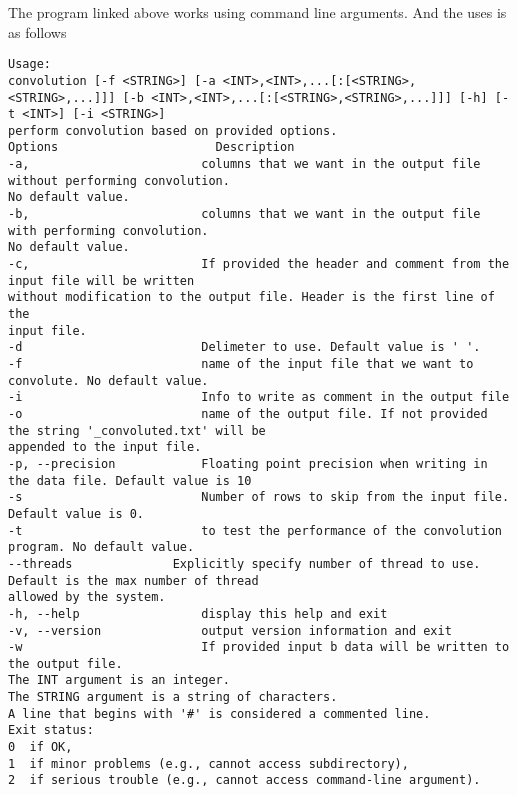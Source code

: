 The program linked above works using command line arguments. And the uses is as follows\\

\begin{lstlisting}[style=Instruction]
Usage:
convolution [-f <STRING>] [-a <INT>,<INT>,...[:[<STRING>,<STRING>,...]]] [-b <INT>,<INT>,...[:[<STRING>,<STRING>,...]]] [-h] [-t <INT>] [-i <STRING>]
perform convolution based on provided options.
Options                      Description
-a,                        columns that we want in the output file without performing convolution.
No default value.
-b,                        columns that we want in the output file with performing convolution.
No default value.
-c,                        If provided the header and comment from the input file will be written
without modification to the output file. Header is the first line of the
input file.
-d                         Delimeter to use. Default value is ' '.
-f                         name of the input file that we want to convolute. No default value.
-i                         Info to write as comment in the output file
-o                         name of the output file. If not provided the string '_convoluted.txt' will be
appended to the input file.
-p, --precision            Floating point precision when writing in the data file. Default value is 10
-s                         Number of rows to skip from the input file. Default value is 0.
-t                         to test the performance of the convolution program. No default value.
--threads              Explicitly specify number of thread to use. Default is the max number of thread
allowed by the system.
-h, --help                 display this help and exit
-v, --version              output version information and exit
-w                         If provided input b data will be written to the output file.
The INT argument is an integer.
The STRING argument is a string of characters.
A line that begins with '#' is considered a commented line.
Exit status:
0  if OK,
1  if minor problems (e.g., cannot access subdirectory),
2  if serious trouble (e.g., cannot access command-line argument).
\end{lstlisting}
